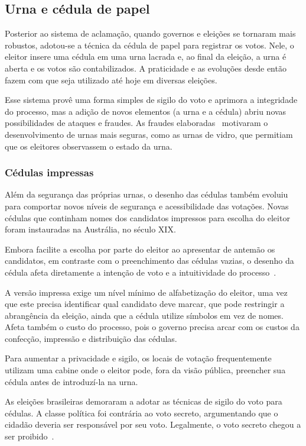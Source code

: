 \subsection{Urna e cédula de papel}

Posterior ao sistema de aclamação, quando governos e eleições se tornaram mais
robustos, adotou-se a técnica da cédula de papel para registrar os votos. Nele,
o eleitor insere uma cédula em uma urna lacrada e, ao final da eleição, a urna
é aberta e os votos são contabilizados. A praticidade e as evoluções desde
então fazem com que seja utilizado até hoje em diversas eleições.

Esse sistema provê uma forma simples de sigilo do voto e aprimora a integridade
do processo, mas a adição de novos elementos (a urna e a cédula) abriu novas
possibilidades de ataques e fraudes. As fraudes elaboradas~\nocite{leslie1856}
motivaram o desenvolvimento de urnas mais seguras, como as urnas de vidro, que
permitiam que os eleitores observassem o estado da urna.

\subsubsection{Cédulas impressas}

Além da segurança das próprias urnas, o desenho das cédulas também evoluiu para
comportar novos níveis de segurança e acessibilidade das votações. Novas
cédulas que continham nomes dos candidatos impressos para escolha do eleitor
foram instauradas na Austrália, no século XIX.

Embora facilite a escolha por parte do eleitor ao apresentar de antemão os
candidatos, em contraste com o preenchimento das cédulas vazias, o desenho da
cédula afeta diretamente a intenção de voto e a intuitividade do
processo~\cite{everett2006measuring}.

A versão impressa exige um nível mínimo de alfabetização do eleitor, uma vez
que este precisa identificar qual candidato deve marcar, que pode restringir a
abrangência da eleição, ainda que a cédula utilize símbolos em vez de nomes.
Afeta também o custo do processo, pois o governo precisa arcar com os custos da
confecção, impressão e distribuição das cédulas.

Para aumentar a privacidade e sigilo, os locais de votação frequentemente
utilizam uma cabine onde o eleitor pode, fora da visão pública, preencher sua
cédula antes de introduzí-la na urna.

As eleições brasileiras demoraram a adotar as técnicas de sigilo do voto para
cédulas. A classe política foi contrária ao voto secreto, argumentando que o
cidadão deveria ser responsável por seu voto. Legalmente, o voto secreto chegou
a ser proibido~\cite{nicolau2012eleicoes}.

